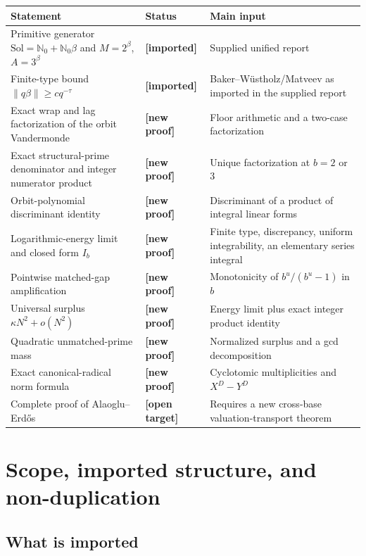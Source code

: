 \documentclass[11pt,oneside]{article}
\theoremstyle{definition}
\theoremstyle{remark}
\newcommand{\Nzero}{\mathbb N_0}
\newcommand{\norm}[1]{\left\lVert #1\right\rVert}
\newcommand{\statusprior}{\textcolor{deepblue}{\textbf{[imported]}}}
\newcommand{\statusnew}{\textcolor{deepgreen}{\textbf{[new proof]}}}
\newcommand{\statusopen}{\textcolor{deepred}{\textbf{[open target]}}}
\begin{document}
\begin{center}
\begin{tabularx}{0.98\textwidth}{>{\raggedright\arraybackslash}X p{} >{\raggedright\arraybackslash}p{}}
\toprule
Statement & Status & Main input \\
\midrule
Primitive generator $\mathrm{Sol}=\Nzero+\Nzero\beta$ and
$M=2^\beta$, $A=3^\beta$ & \statusprior & Supplied unified report \\
Finite-type bound $\norm{q\beta}\ge c q^{-\tau}$ & \statusprior & Baker--W\"ustholz/Matveev as imported in the supplied report \\
Exact wrap and lag factorization of the orbit Vandermonde & \statusnew & Floor arithmetic and a two-case factorization \\
Exact structural-prime denominator and integer numerator product & \statusnew & Unique factorization at $b=2$ or $3$ \\
Orbit-polynomial discriminant identity & \statusnew & Discriminant of a product of integral linear forms \\
Logarithmic-energy limit and closed form $I_b$ & \statusnew & Finite type, discrepancy, uniform integrability, an elementary series integral \\
Pointwise matched-gap amplification & \statusnew & Monotonicity of $b^u/(b^u-1)$ in $b$ \\
Universal surplus $\kappa N^2+o(N^2)$ & \statusnew & Energy limit plus exact integer product identity \\
Quadratic unmatched-prime mass & \statusnew & Normalized surplus and a gcd decomposition \\
Exact canonical-radical norm formula & \statusnew & Cyclotomic multiplicities and $X^D-Y^D$ \\
Complete proof of Alaoglu--Erd\H{o}s & \statusopen & Requires a new cross-base valuation-transport theorem \\
\bottomrule
\end{tabularx}
\end{center}

\section{Scope, imported structure, and non-duplication}
\label{sec:scope}

\subsection{What is imported}
\end{document}
